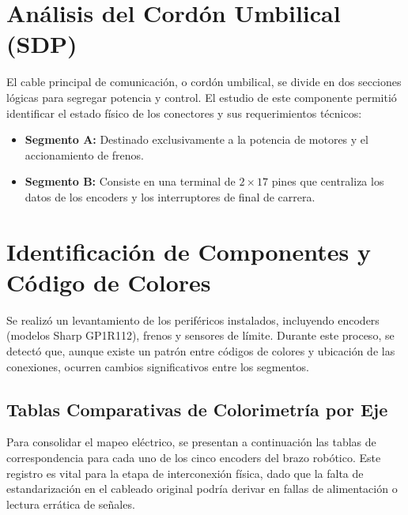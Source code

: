 \section{Análisis del Cordón Umbilical (SDP)}
El cable principal de comunicación, o cordón umbilical, se divide en dos secciones lógicas para segregar potencia y control. El estudio de este componente permitió identificar el estado físico de los conectores y sus requerimientos técnicos:

\begin{itemize}
	\item \textbf{Segmento A:} Destinado exclusivamente a la potencia de motores y el accionamiento de frenos.
	\item \textbf{Segmento B:} Consiste en una terminal de $2 \times 17$ pines que centraliza los datos de los encoders y los interruptores de final de carrera.
\end{itemize}

\section{Identificación de Componentes y Código de Colores}
Se realizó un levantamiento de los periféricos instalados, incluyendo encoders (modelos Sharp GP1R112), frenos y sensores de límite. Durante este proceso, se detectó que, aunque existe un patrón entre códigos de colores y ubicación de las conexiones, ocurren cambios significativos entre los segmentos.

\subsection{Tablas Comparativas de Colorimetría por Eje}

Para consolidar el mapeo eléctrico, se presentan a continuación las tablas de correspondencia para cada uno de los cinco encoders del brazo robótico. Este registro es vital para la etapa de interconexión física, dado que la falta de estandarización en el cableado original podría derivar en fallas de alimentación o lectura errática de señales.


